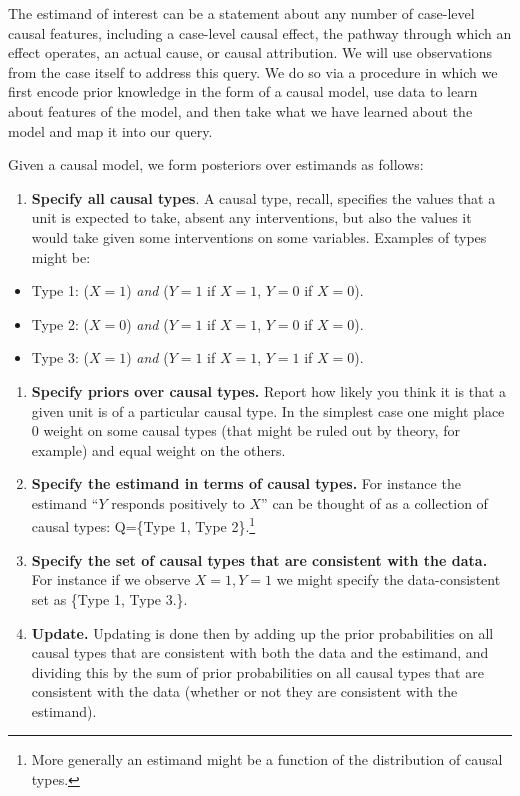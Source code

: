 \documentclass[
  12pt,
]{book}
\providecommand{\tightlist}{%
  \setlength{\itemsep}{0pt}\setlength{\parskip}{0pt}}
\begin{document}
The estimand of interest can be a statement about any number of case-level causal features, including a case-level causal effect, the pathway through which an effect operates, an actual cause, or causal attribution. We will use observations from the case itself to address this query. We do so via a procedure in which we first encode prior knowledge in the form of a causal model, use data to learn about features of the model, and then take what we have learned about the model and map it into our query.

Given a causal model, we form posteriors over estimands as follows:

\begin{enumerate}
\def\labelenumi{\arabic{enumi}.}
\tightlist
\item
  \textbf{Specify all causal types}. A causal type, recall, specifies the values that a unit is expected to take, absent any interventions, but also the values it would take given some interventions on some variables. Examples of types might be:
\end{enumerate}

\begin{itemize}
\tightlist
\item
  Type 1: (\(X=1\)) \emph{and} (\(Y=1\) if \(X=1\), \(Y=0\) if \(X=0\)).
\item
  Type 2: (\(X=0\)) \emph{and} (\(Y=1\) if \(X=1\), \(Y=0\) if \(X=0\)).
\item
  Type 3: (\(X=1\)) \emph{and} (\(Y=1\) if \(X=1\), \(Y=1\) if \(X=0\)).
\end{itemize}

\begin{enumerate}
\def\labelenumi{\arabic{enumi}.}
\setcounter{enumi}{1}
\item
  \textbf{Specify priors over causal types.} Report how likely you think it is that a given unit is of a particular causal type. In the simplest case one might place 0 weight on some causal types (that might be ruled out by theory, for example) and equal weight on the others.
\item
  \textbf{Specify the estimand in terms of causal types.} For instance the estimand ``\(Y\) responds positively to \(X\)'' can be thought of as a collection of causal types: Q=\{Type 1, Type 2\}.\footnote{More generally an estimand might be a function of the distribution of causal types.}
\item
  \textbf{Specify the set of causal types that are consistent with the data.} For instance if we observe \(X=1, Y=1\) we might specify the data-consistent set as \{Type 1, Type 3.\}.
\item
  \textbf{Update.} Updating is done then by adding up the prior probabilities on all causal types that are consistent with both the data and the estimand, and dividing this by the sum of prior probabilities on all causal types that are consistent with the data (whether or not they are consistent with the estimand).
\end{enumerate}
\end{document}
